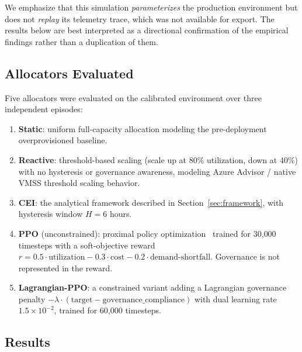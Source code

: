 \documentclass[runningheads]{llncs}
\begin{document}
We emphasize that this simulation \emph{parameterizes} the production environment but does not \emph{replay} its telemetry trace, which was not available for export. The results below are best interpreted as a directional confirmation of the empirical findings rather than a duplication of them.

\subsection{Allocators Evaluated}

Five allocators were evaluated on the calibrated environment over three independent episodes:

\begin{enumerate}
\item \textbf{Static}: uniform full-capacity allocation modeling the pre-deployment overprovisioned baseline.
\item \textbf{Reactive}: threshold-based scaling (scale up at 80\% utilization, down at 40\%) with no hysteresis or governance awareness, modeling Azure Advisor / native VMSS threshold scaling behavior.
\item \textbf{CEI}: the analytical framework described in Section~\ref{sec:framework}, with hysteresis window $H = 6$ hours.
\item \textbf{PPO} (unconstrained): proximal policy optimization~\cite{schulman} trained for 30{,}000 timesteps with a soft-objective reward $r = 0.5 \cdot \text{utilization} - 0.3 \cdot \text{cost} - 0.2 \cdot \text{demand-shortfall}$. Governance is not represented in the reward.
\item \textbf{Lagrangian-PPO}: a constrained variant adding a Lagrangian governance penalty $-\lambda \cdot (\text{target} - \text{governance\_compliance})$ with dual learning rate $1.5 \times 10^{-2}$, trained for 60{,}000 timesteps.
\end{enumerate}

\subsection{Results}
\end{document}
